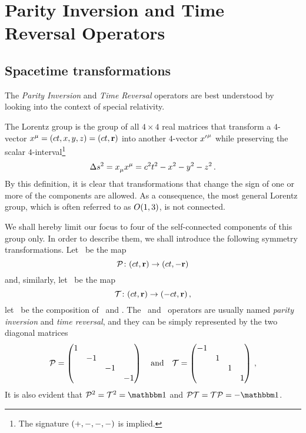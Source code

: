 \chapter{Parity Inversion and Time Reversal Operators}\label{ch:pt-operators}
    \section{Spacetime transformations}
        The \emph{Parity Inversion} and \emph{Time Reversal} operators are best understood by looking into the context of special relativity.

        The Lorentz group is the group of all $4\times4$ real matrices that transform a $4$-vector $\tensor{x}{^\mu} = \pqty{ct,x,y,z} = \pqty{ct,\vb{r}}$ into another $4$-vector $\tensor{{x'}}{^\mu}$ while preserving the scalar $4$-interval\footnote{The signature $\pqty{+,-,-,-}$ is implied.}
        \begin{equation}
            \label{eq:4-interval}
            \Delta s^2 = \tensor{x}{_\mu} \tensor{x}{^\mu} = c^2t^2 - x^2 - y^2 - z^2
            \myperiod
        \end{equation}
        By this definition, it is clear that transformations that change the sign of one or more of the components are allowed. As a consequence, the most general Lorentz group, which is often referred to as $O\pqty{1,3}$, is not connected.

        We shall hereby limit our focus to four of the self-connected components of this group only. In order to describe them, we shall introduce the following symmetry transformations. Let \mcP\ be the map 
        \begin{equation}
            \label{eq:lorentz-P}
            \func{\mcP}{\pqty{ct,\vb{r}}}{\pqty{ct,-\vb{r}}}
        \end{equation}
        and, similarly, let \mcT\ be the map
        \begin{equation}
            \label{eq:lorentz-T}
            \func{\mcT}{\pqty{ct,\vb{r}}}{\pqty{-ct,\vb{r}}}
            \mycomma
        \end{equation}
        let \PT\ be the composition of \mcP\ and \mcT.
        The \mcP\ and \mcT\ operators are usually named \emph{parity inversion} and \emph{time reversal}, and they can be simply represented by the two diagonal matrices
        \begin{equation*}
            \mcP = \pmqty{\dmat{1,-1,-1,-1}}
            \qand
            \mcT = \pmqty{\dmat{-1,1,1,1}}
            \mycomma
        \end{equation*}
        It is also evident that $\mcP^2 = \mcT^2 = \idM$ and $\PT = \mcT\mcP = -\idM$.
        
